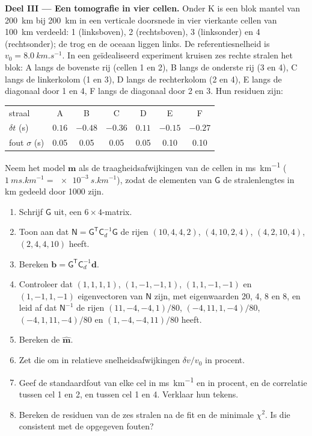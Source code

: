 \begin{problem}
\noindent\textbf{Deel III --- Een tomografie in vier cellen.} Onder K is een blok
mantel van \qty{200}{km} bij \qty{200}{km} in een verticale doorsnede in vier
vierkante cellen van \qty{100}{km} verdeeld: 1 (linksboven), 2 (rechtsboven), 3
(linksonder) en 4 (rechtsonder); de trog en de oceaan liggen links. De referentiesnelheid is $v_0 = \qty{8.0}{km.s^{-1}}$. In een
geïdealiseerd experiment kruisen zes rechte stralen het blok: A langs de bovenste
rij (cellen 1 en 2), B langs de onderste rij (3 en 4), C langs de linkerkolom (1 en
3), D langs de rechterkolom (2 en 4), E langs de diagonaal door 1 en 4, F langs de
diagonaal door 2 en 3. Hun residuen zijn:
\begin{center}
\small
\begin{tabular}{lcccccc}
\hline
straal & A & B & C & D & E & F \\
$\delta t$ (\unit{s}) & $0.16$ & $-0.48$ & $-0.36$ & $0.11$ & $-0.15$ & $-0.27$ \\
fout $\sigma$ (\unit{s}) & 0.05 & 0.05 & 0.05 & 0.05 & 0.10 & 0.10 \\
\hline
\end{tabular}
\end{center}
Neem het model $\mathbf m$ als de traagheidsafwijkingen van de cellen in
\unit{ms.km^{-1}} ($\qty{1}{ms.km^{-1}} = \qty{e-3}{s.km^{-1}}$), zodat de
elementen van $\mathsf G$ de stralenlengtes in \unit{km} gedeeld door 1000 zijn.
\begin{enumerate}[resume]
  \item Schrijf $\mathsf G$ uit, een $6\times4$-matrix.
  \item Toon aan dat $\mathsf N = \mathsf G^{\mathsf T}\mathsf C_d^{-1}\mathsf G$
        de rijen $(10, 4, 4, 2)$, $(4, 10, 2, 4)$, $(4, 2, 10, 4)$,
        $(2, 4, 4, 10)$ heeft.
  \item Bereken $\mathbf b = \mathsf G^{\mathsf T}\mathsf C_d^{-1}\mathbf d$.
  \item Controleer dat $(1,1,1,1)$, $(1,-1,-1,1)$, $(1,1,-1,-1)$ en $(1,-1,1,-1)$
        eigenvectoren van $\mathsf N$ zijn, met eigenwaarden 20, 4, 8 en 8, en
        leid af dat $\mathsf N^{-1}$ de rijen $(11, -4, -4, 1)/80$,
        $(-4, 11, 1, -4)/80$, $(-4, 1, 11, -4)/80$ en $(1, -4, -4, 11)/80$ heeft.
  \item Bereken de  $\hat{\mathbf m}$.
  \item Zet die om in relatieve snelheidsafwijkingen $\delta v/v_0$ in procent.
  \item Geef de standaardfout van elke cel in \unit{ms.km^{-1}} en in procent,
        en de correlatie tussen cel 1 en 2, en tussen cel 1 en 4. Verklaar hun
        tekens.
  \item Bereken de residuen van de zes stralen na de fit en de minimale
        $\chi^2$. Is die consistent met de opgegeven fouten?
\end{enumerate}


\end{problem}
